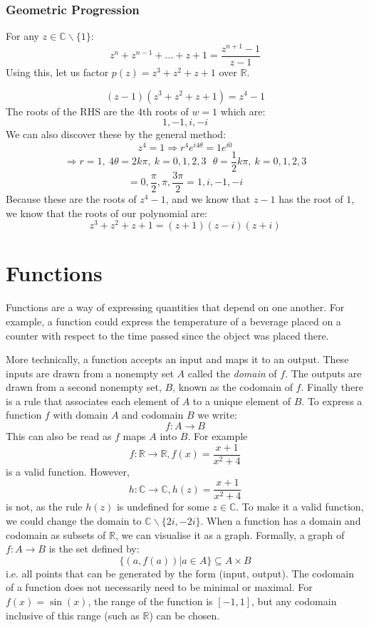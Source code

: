 \documentclass[12pt]{report}
\newcommand{\R}{\mathbb{R}}
\newcommand{\C}{\mathbb{C}}
\begin{document}
\begin{flushleft}
\subsubsection*{Geometric Progression}
For any \(z \in \C \backslash \{1\}\):
\[z^n + z^{n - 1} + ... + z + 1 = \frac{z^{n + 1} - 1}{z - 1}\]
Using this, let us factor \(p(z) = z^3 + z^2 + z + 1\) over \(\R\).
\begin{center}
    \[(z - 1)(z^3 + z^2 + z + 1) = z^4 - 1\]
    The roots of the RHS are the 4th roots of \(w = 1\) which are:
    \[1, -1, i, -i\]
    We can also discover these by the general method:
    \[z^4 = 1 \Rightarrow r^4e^{i4\theta} = 1e^{i0}\]
    \[\Rightarrow r = 1,\: 4\theta = 2k\pi,\: k = 0, 1, 2, 3 \:\:\: \theta = \frac{1}{2}k\pi,\: k = 0, 1, 2, 3\]
    \[= 0, \frac{\pi}{2}, \pi, \frac{3\pi}{2} = 1, i, -1, -i\]
    Because these are the roots of \(z^4 - 1\), and we know that \(z - 1\) has
    the root of \(1\), we know that the roots of our polynomial are:
    \[z^3 + z^2 + z + 1 = (z + 1)(z - i)(z + i)\]
\end{center}

\section*{Functions}
Functions are a way of expressing quantities that depend on one another.
For example, a function could express the temperature of a beverage placed on a 
counter with respect to the time passed since the object was placed there.

\bigskip
More technically, a function accepts an input and maps it to an output. These inputs
are drawn from a nonempty set \(A\) called the \textit{domain} of \(f\). The outputs
are drawn from a second nonempty set, \(B\), known as the codomain of \(f\). Finally 
there is a rule that associates each element of \(A\) to a unique element of \(B\).
To express a function \(f\) with domain \(A\) and codomain \(B\) we write:
\[f: A \rightarrow B\]
This can also be read as \(f\) maps \(A\) into \(B\). For example
\[f: \R \rightarrow \R, f(x) = \frac{x + 1}{x^2 + 4}\]
is a valid function. However,
\[h: \C \rightarrow \C, h(z) = \frac{x + 1}{x^2 + 4}\]
is not, as the rule \(h(z)\) is undefined for some \(z \in \C\).
To make it a valid function, we could change the domain to
\(\C \backslash \{2i, -2i\}\).
When a function has a domain and codomain as subsets of \(\R\), we can
visualise it as a graph. Formally, a graph of \(f: A \rightarrow B\) is the set defined by:
\[\{(a, f(a)) | a \in A\} \subseteq A \times B\]
i.e. all points that can be generated by the form (input, output). The codomain
of a function does not necessarily need to be minimal or maximal. For \(f(x) = \sin(x)\),
the range of the function is \([-1, 1]\), but any codomain inclusive of this range (such 
as \(\R\)) can be chosen.


\end{flushleft}
\end{document}
